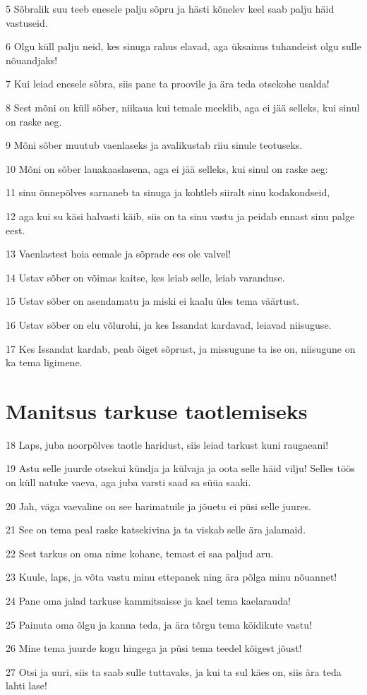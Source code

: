 \par 5 Sõbralik suu teeb enesele palju sõpru ja hästi kõnelev keel saab palju häid vastuseid.
\par 6 Olgu küll palju neid, kes sinuga rahus elavad, aga üksainus tuhandeist olgu sulle nõuandjaks!
\par 7 Kui leiad enesele sõbra, siis pane ta proovile ja ära teda otsekohe usalda!
\par 8 Sest mõni on küll sõber, niikaua kui temale meeldib, aga ei jää selleks, kui sinul on raske aeg.
\par 9 Mõni sõber muutub vaenlaseks ja avalikustab riiu sinule teotuseks.
\par 10 Mõni on sõber lauakaaslasena, aga ei jää selleks, kui sinul on raske aeg:
\par 11 sinu õnnepõlves sarnaneb ta sinuga ja kohtleb siiralt sinu kodakondseid,
\par 12 aga kui su käsi halvasti käib, siis on ta sinu vastu ja peidab ennast sinu palge eest.
\par 13 Vaenlastest hoia eemale ja sõprade ees ole valvel!
\par 14 Ustav sõber on võimas kaitse, kes leiab selle, leiab varanduse.
\par 15 Ustav sõber on asendamatu ja miski ei kaalu üles tema väärtust.
\par 16 Ustav sõber on elu võlurohi, ja kes Issandat kardavad, leiavad niisuguse.
\par 17 Kes Issandat kardab, peab õiget sõprust, ja missugune ta ise on, niisugune on ka tema ligimene.

\section*{Manitsus tarkuse taotlemiseks}

\par 18 Laps, juba noorpõlves taotle haridust, siis leiad tarkust kuni raugaeani!
\par 19 Astu selle juurde otsekui kündja ja külvaja ja oota selle häid vilju! Selles töös on küll natuke vaeva, aga juba varsti saad sa süüa saaki.
\par 20 Jah, väga vaevaline on see harimatuile ja jõuetu ei püsi selle juures.
\par 21 See on tema peal raske katsekivina ja ta viskab selle ära jalamaid.
\par 22 Sest tarkus on oma nime kohane, temast ei saa paljud aru.
\par 23 Kuule, laps, ja võta vastu minu ettepanek ning ära põlga minu nõuannet!
\par 24 Pane oma jalad tarkuse kammitsaisse ja kael tema kaelarauda!
\par 25 Painuta oma õlgu ja kanna teda, ja ära tõrgu tema köidikute vastu!
\par 26 Mine tema juurde kogu hingega ja püsi tema teedel kõigest jõust!
\par 27 Otsi ja uuri, siis ta saab sulle tuttavaks, ja kui ta sul käes on, siis ära teda lahti lase!

